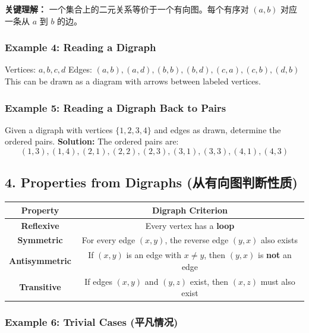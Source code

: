 \documentclass[10pt,a4paper,openany]{ctexbook}
\theoremstyle{definition}
\theoremstyle{remark}
\renewenvironment{quote}
  {\list{}{\leftmargin=1em\rightmargin=0pt\topsep=0.5pt\partopsep=0pt}\item[]}
  {\endlist}
\begin{document}
\begin{quote}
\textbf{关键理解：} 一个集合上的二元关系等价于一个有向图。每个有序对 $(a,b)$ 对应一条从 $a$ 到 $b$ 的边。

\end{quote}

\subsubsection{Example 4: Reading a Digraph}

Vertices: $a, b, c, d$
Edges: $(a,b), (a,d), (b,b), (b,d), (c,a), (c,b), (d,b)$
This can be drawn as a diagram with arrows between labeled vertices.
\subsubsection{Example 5: Reading a Digraph Back to Pairs}

Given a digraph with vertices $\{1,2,3,4\}$ and edges as drawn, determine the ordered pairs.
\textbf{Solution:} The ordered pairs are:
\[
(1,3), (1,4), (2,1), (2,2), (2,3), (3,1), (3,3), (4,1), (4,3)
\]

\vspace{-2pt}

\subsection{4. Properties from Digraphs (从有向图判断性质)}

\begin{center}
\begin{tabular}{cc}
\hline
Property & Digraph Criterion \\ \hline
\textbf{Reflexive} & Every vertex has a \textbf{loop} \\
\textbf{Symmetric} & For every edge $(x,y)$, the reverse edge $(y,x)$ also exists \\
\textbf{Antisymmetric} & If $(x,y)$ is an edge with $x \neq y$, then $(y,x)$ is \textbf{not} an edge \\
\textbf{Transitive} & If edges $(x,y)$ and $(y,z)$ exist, then $(x,z)$ must also exist \\
\hline
\end{tabular}

\end{center}

\subsubsection{Example 6: Trivial Cases (平凡情况)}
\end{document}
